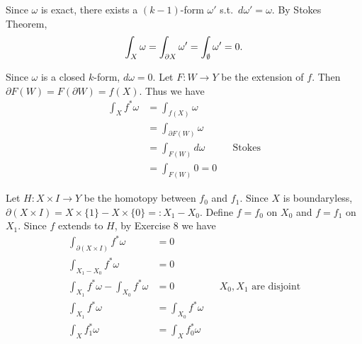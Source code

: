 \documentclass[12pt,class=article,crop=false]{standalone}
\begin{document}
\begin{problem}[4.7.7]
Since $ \omega$ is exact, there exists a $ (k-1)$-form $ \omega'$ s.t.\ $ d \omega' = \omega$. By Stokes Theorem,
\begin{align*}
	\int_{X} \omega = \int_{ \partial X} \omega' = \int_{ \emptyset} \omega' = 0.
\end{align*}
\end{problem}
\begin{problem}[4.7.8]
Since $ \omega$ is a closed $ k$-form,  $ d \omega = 0$. Let $ F: W \to Y$ be the extension of $ f$. Then $ \partial F(W) = F(\partial W) = f(X)$. Thus we have
 \begin{align*}
	\int_X f^* \omega &= \int_{f(X)} \omega \\
	&= \int_{ \partial F(W)} \omega \\
	&= \int_{F(W)} d\omega && \text{Stokes} \\
	&= \int_{F(W)} 0 =0
\end{align*}
\end{problem}

\begin{problem}[4.7.9]
Let $ H: X \times I \to Y$ be the homotopy between $ f_0$ and $ f_1$. Since $ X$ is boundaryless,  $ \partial (X \times I) = X \times \{1\} - X \times \{0\}=: X_1 - X_0 $. Define $ f= f_0$ on $ X_0 $ and $ f= f_1$ on $ X_1$. Since $ f$ extends to  $ H$, by Exercise 8 we have
\begin{align*}
	\int_{\partial (X \times I)} f^*\omega &= 0 \\
	\int_{X_1 - X_0} f^* \omega &= 0 \\
	\int_{X_1} f^* \omega - \int_{X_0} f^* \omega&= 0 && X_0,X_1 \text{ are disjoint} \\
	\int_{X_1} f^* \omega &= \int_{X_0} f^* \omega\\
	\int_X f_1^* \omega &= \int_{X} f_0^* \omega  
\end{align*}
\end{problem}
\end{document}
